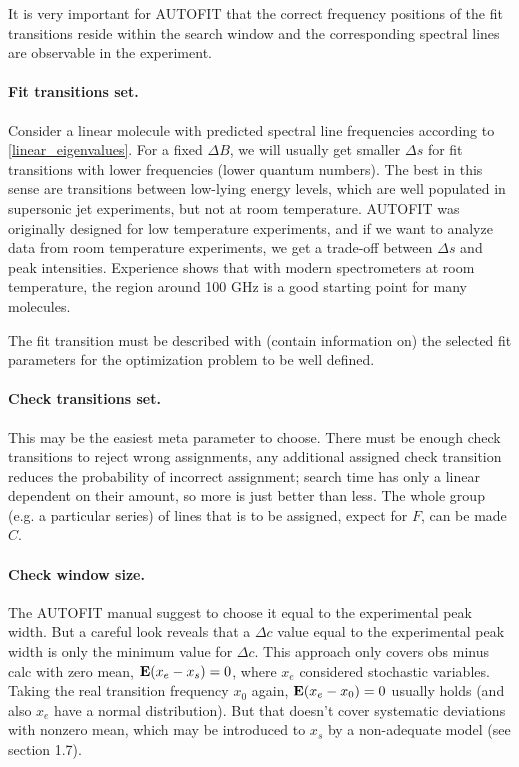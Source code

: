 \documentclass[11pt]{article}
\begin{document}
It is very important for AUTOFIT that the correct frequency positions of the fit transitions reside within the search window and the corresponding spectral lines are observable in the experiment.

\paragraph{Fit transitions set.}

Consider a linear molecule with predicted spectral line frequencies according to \ref{linear_eigenvalues}. For a fixed $\Delta B$, we will usually get smaller $\Delta s$ for fit transitions with lower frequencies (lower quantum numbers). The best in this sense are transitions between low-lying energy levels, which are well populated in supersonic jet experiments, but not at room temperature. AUTOFIT was originally designed for low temperature experiments, and if we want to analyze data from room temperature experiments, we get a trade-off between $\Delta s$ and peak intensities. Experience shows that with modern spectrometers at room temperature, the region around 100 GHz is a good starting point for many molecules.

The fit transition must be described with (contain information on) the selected fit parameters for the optimization problem to be well defined.

\paragraph{Check transitions set.}

This may be the easiest meta  parameter to choose. There must be enough check transitions to reject wrong assignments, any additional assigned check transition reduces the probability of incorrect assignment; search time has only a linear dependent on their amount, so more is just better than less. The whole group (e.g. a particular series) of lines that is to be assigned, expect for $F$, can be made $C$.

\paragraph{Check window size.}

The AUTOFIT manual suggest to choose it equal to the experimental peak width. But a careful look reveals that a $\Delta c$ value equal to the experimental peak width is only the minimum value for $\Delta c$. This approach only covers obs minus calc  with zero mean, $\mathbf{E} (x_e - x_s) = 0$, where $x_e$ considered stochastic variables. Taking the real transition frequency $x_0$ again, $\mathbf{E} (x_e - x_0) = 0$ usually holds (and also $x_e$ have a normal distribution). But that doesn't cover systematic deviations with nonzero mean, which may be introduced to $x_s$ by a non-adequate model (see section 1.7).
\end{document}
